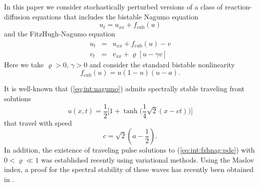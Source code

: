 \documentclass[10pt]{articleHJ}
\newcommand{\sref}[1]{(\ref{#1})}                       %
\numberwithin{equation}{section}
\begin{document}
In this paper we consider stochastically perturbed versions
of a class of reaction-diffusion equations
that includes the bistable Nagumo equation
\begin{equation}
\label{eq:int:nagumo}
u_t = u_{xx} + f_{\mathrm{cub}}(u)
\end{equation}
and the FitzHugh-Nagumo equation
\begin{equation}
\label{eq:int:fzhnag:pde}
\begin{array}{lcl}
u_t & = & u_{xx} + f_{\mathrm{cub}}(u) - v
\\[0.2cm]
v_t & = & v_{xx} + \varrho [ u - \gamma v ]
\end{array}
\end{equation}
Here we take $\varrho > 0$, $\gamma > 0$ and consider
the standard bistable nonlinearity
\begin{equation}
f_{\mathrm{cub}}(u) = u ( 1 - u )( u -a ).
\end{equation}

It is well-known \cite{Fife1977,Sattinger} that \sref{eq:int:nagumo}
admits spectrally stable traveling front solutions
\begin{equation}
u(x,t) = \frac{1}{2}
  \big[ 1 + \tanh(\frac{1}{4} \sqrt{2} (x - ct) \big) \big]
\end{equation}
that travel with speed
\begin{equation}
c =  \sqrt{2}  \left(a - \frac{1}{2} \right).
\end{equation}
In addition, the existence of traveling
pulse solutions to \sref{eq:int:fzhnag:pde}
with $0 < \varrho \ll 1$
was established recently \cite{chen2015traveling}
using variational methods. Using the Maslov index,
a proof for the spectral stability of these waves
has recently been obtained in \cite{cornwell2017opening,cornwell2017existence}.
\end{document}
